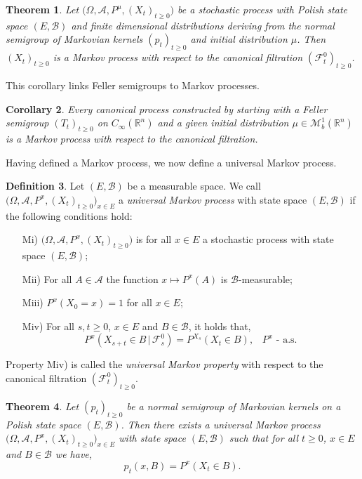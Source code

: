 \documentclass[a4paper, 12pt]{report}
\newtheorem{theorem}{Theorem}[section]
\newtheorem{corollary}[theorem]{Corollary}
\theoremstyle{remark}
\theoremstyle{definition}
\newtheorem{definition}[theorem]{Definition}
\begin{document}
\begin{theorem}
Let $\big(\Omega, \mathcal{A}, P^\mu, (X_t)_{t \ge 0}\big)$ be a stochastic process with Polish state space $(E, \mathcal{B})$ and finite dimensional distributions deriving from the normal semigroup of Markovian kernels $(p_t)_{t \ge 0}$ and initial distribution $\mu$.  Then $(X_t)_{t \ge 0}$ is a Markov process with respect to the canonical filtration $(\mathcal{F}_t^0)_{t \ge 0}$.
\end{theorem}
This corollary links Feller semigroups to Markov processes.
\begin{corollary}
Every canonical process constructed by starting with a Feller semigroup $(T_t)_{t \ge 0}$ on $C_\infty(\mathbb{R}^n)$ and a given initial distribution $\mu \in \mathcal{M}_b^1(\mathbb{R}^n)$ is a Markov process with respect to the canonical filtration.
\end{corollary}
Having defined a Markov process, we now define a universal Markov process.

\begin{definition}
Let $(E, \mathcal{B})$ be a measurable space.  We call \\$\big(\Omega, \mathcal{A}, P^x, (X_t)_{t \ge 0}\big)_{x \in E}$ a \emph{universal Markov process} with state space $(E, \mathcal{B})$ if the following conditions hold:
\begin{itemize}

\item[Mi)] $\big(\Omega, \mathcal{A}, P^x, (X_t)_{t \ge 0}\big)$ is for all $x \in E$ a stochastic process with state space $(E, \mathcal{B})$;

\item[Mii)] For all $A \in \mathcal{A}$ the function $x \mapsto P^x(A)$ is $\mathcal{B}$-measurable;

\item[Miii)] $P^x(X_0 = x) = 1$ for all $x \in E$;

\item[Miv)] For all $s, t \ge 0$, $x \in E$ and $B \in \mathcal{B}$, it holds that,
$$
P^x(X_{s + t} \in B\,|\, \mathcal{F}_s^0) = P^{X_s}(X_t \in B), \,\,\,\,\, P^x \text{ - a.s.}
$$

\end{itemize}
Property Miv) is called the \emph{universal Markov property} with respect to the canonical filtration $(\mathcal{F}_t^0)_{t \ge 0}$.
\end{definition}

\begin{theorem}
Let $(p_t)_{t \ge 0}$ be a normal semigroup of Markovian kernels on a Polish state space $(E, \mathcal{B})$.  Then there exists a universal Markov process $\big(\Omega, \mathcal{A}, P^x, (X_t)_{t \ge 0}\big)_{x \in E}$ with state space $(E, \mathcal{B})$ such that for all $t \ge 0$, $x \in E$ and $B \in \mathcal{B}$ we have,
$$
p_t(x, B) = P^x(X_t \in B).
$$
\end{theorem}
\end{document}
